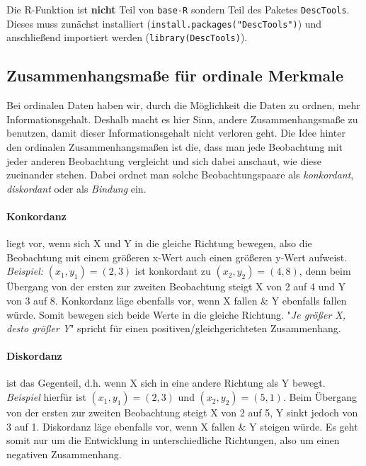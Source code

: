 \documentclass[a4paper]{article}
\newcommand\dangersign{%
 \makebox[1.8em][c]{%
 \makebox[0pt][c]{\raisebox{.15em}{\small!}}%
 \makebox[0pt][c]{\color{red}\Large$\triangle$}}}%
\begin{document}
\noindent  {}

\noindent \dangersign Die R-Funktion ist \textbf{nicht} Teil von \texttt{base-R} sondern Teil des Paketes \texttt{DescTools}. Dieses muss zunächst installiert (\texttt{install.packages("DescTools")}) und anschließend importiert werden (\texttt{library(DescTools)}).

\clearpage

\subsection{Zusammenhangsmaße für ordinale Merkmale}\label{sec:zshg-ord}
Bei ordinalen Daten haben wir, durch die Möglichkeit die Daten zu ordnen, mehr Informationsgehalt. Deshalb macht es hier Sinn, andere Zusammenhangsmaße zu benutzen, damit dieser Informationsgehalt nicht verloren geht. Die Idee hinter den ordinalen Zusammenhangsmaßen ist die, dass man jede Beobachtung mit jeder anderen Beobachtung vergleicht und sich dabei anschaut, wie diese zueinander stehen. Dabei ordnet man solche Beobachtungspaare als \textit{konkordant}, \textit{diskordant} oder als \textit{Bindung} ein.

\paragraph{Konkordanz} liegt vor, wenn sich X und Y in die gleiche Richtung bewegen, also die Beobachtung mit einem größeren x-Wert auch einen größeren y-Wert aufweist.\\
\textit{Beispiel:} $(x_1,y_1)=(2,3)$ ist konkordant zu $(x_2,y_2)=(4,8)$, denn beim Übergang von der ersten zur zweiten Beobachtung steigt X von 2 auf 4 und Y von 3 auf 8. Konkordanz läge ebenfalls vor, wenn X fallen \& Y ebenfalls fallen würde. Somit bewegen sich beide Werte in die gleiche Richtung. "\textit{Je größer X, desto größer Y}" spricht für einen positiven/gleichgerichteten Zusammenhang.

\paragraph{Diskordanz} ist das Gegenteil, d.h. wenn X sich in eine andere Richtung als Y bewegt.\\
\textit{Beispiel} hierfür ist $(x_1,y_1)=(2,3)$ und $(x_2,y_2)=(5,1)$. Beim Übergang von der ersten zur zweiten Beobachtung steigt X von 2 auf 5, Y sinkt jedoch von 3 auf 1. Diskordanz läge ebenfalls vor, wenn X fallen \& Y steigen würde. Es geht somit nur um die Entwicklung in unterschiedliche Richtungen, also um einen negativen Zusammenhang.
\end{document}
